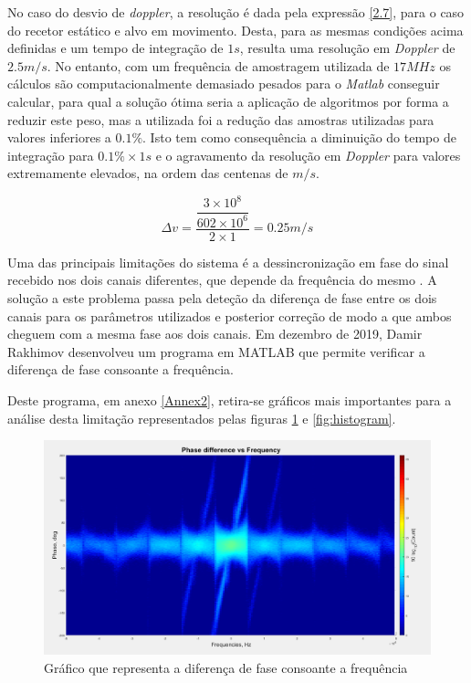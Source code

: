 No caso do desvio de \textit{doppler}, a resolução é dada pela expressão \ref{2.7}, para o caso do recetor estático e alvo em movimento. Desta, para as mesmas condições acima definidas e um tempo de integração de $1 s$, resulta uma resolução em \textit{Doppler} de $2.5 m/s$. No entanto, com um frequência de amostragem utilizada de $17 MHz$ os cálculos são computacionalmente demasiado pesados para o \textit{Matlab} conseguir calcular, para qual a solução ótima seria a aplicação de algoritmos por forma a reduzir este peso, mas a utilizada foi a redução das amostras utilizadas para valores inferiores a $0.1\% $. Isto tem como consequência a diminuição do tempo de integração para $0.1\% \times 1s$ e o agravamento da resolução em \textit{Doppler} para valores extremamente elevados, na ordem das centenas de $m/s$.

\begin{equation} \label{5.2}
\Delta v = \dfrac{\dfrac{3\times 10^{8}}{602\times 10^{6}}}{2\times 1} = 0.25 m/s
\end{equation}


Uma das principais limitações do sistema é a dessincronização em fase do sinal recebido nos dois canais diferentes, que depende da frequência do mesmo \cite{Kraus1988}. A solução a este problema passa pela deteção da diferença de fase entre os dois canais para os parâmetros utilizados e posterior correção de modo a que ambos cheguem com a mesma fase aos dois canais. Em dezembro de 2019, Damir Rakhimov desenvolveu um programa em MATLAB que permite verificar a diferença de fase consoante a frequência.\par
Deste programa, em anexo \ref{Annex2}, retira-se gráficos mais importantes para a análise desta limitação representados pelas figuras \ref{fig:phasefreq} e \ref{fig:histogram}.

\begin{figure}[h]
\centering
\includegraphics[scale=0.35]{chapters/ch5/assets/phasefreq}
\caption[Diferença de fase vs Frequência]{Gráfico que representa a diferença de fase consoante a frequência}
\label{fig:phasefreq}
\end{figure}

